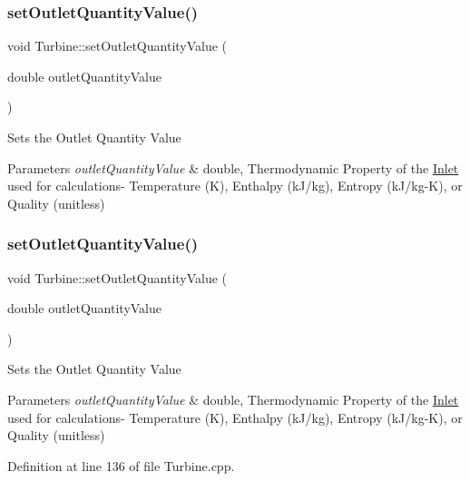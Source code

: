 \subsubsection{\texorpdfstring{set\+Outlet\+Quantity\+Value()}{setOutletQuantityValue()}\hspace{0.1cm}{\footnotesize\ttfamily [2/3]}}
{\footnotesize\ttfamily void Turbine\+::set\+Outlet\+Quantity\+Value (\begin{DoxyParamCaption}\item[{double}]{outlet\+Quantity\+Value }\end{DoxyParamCaption})}

Sets the Outlet Quantity Value


\begin{DoxyParams}{Parameters}
{\em outlet\+Quantity\+Value} & double, Thermodynamic Property of the \hyperlink{class_inlet}{Inlet} used for calculations-\/ Temperature (K), Enthalpy (k\+J/kg), Entropy (k\+J/kg-\/K), or Quality (unitless) \\
\hline
\end{DoxyParams}
\mbox{\label{class_turbine_ab37326068f633280de8f8144b9c8eb89}} 
\subsubsection{\texorpdfstring{set\+Outlet\+Quantity\+Value()}{setOutletQuantityValue()}\hspace{0.1cm}{\footnotesize\ttfamily [3/3]}}
{\footnotesize\ttfamily void Turbine\+::set\+Outlet\+Quantity\+Value (\begin{DoxyParamCaption}\item[{double}]{outlet\+Quantity\+Value }\end{DoxyParamCaption})}

Sets the Outlet Quantity Value


\begin{DoxyParams}{Parameters}
{\em outlet\+Quantity\+Value} & double, Thermodynamic Property of the \hyperlink{class_inlet}{Inlet} used for calculations-\/ Temperature (K), Enthalpy (k\+J/kg), Entropy (k\+J/kg-\/K), or Quality (unitless) \\
\hline
\end{DoxyParams}


Definition at line 136 of file Turbine.\+cpp.

